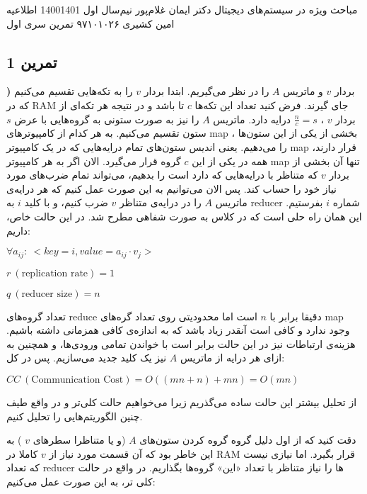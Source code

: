 \documentclass[a4paper,12pt]{article}
\newcounter{subproblemcounter}
\newcommand{\problem}[1]
{
	\subsection*{
		تمرین
		#1
	}
}
\newcommand{\subproblem}{
	\textbf{\harfi{subproblemcounter})}\stepcounter{subproblemcounter}
}
\begin{document}
\handout
{مباحث ویژه در سیستم‌های دیجیتال}
{دکتر ایمان غلام‌پور}
{نیم‌سال اول 1400\lr{-}1401}
{اطلاعیه}
{امین کشیری}
{۹۷۱۰۱۰۲۶}
 {تمرین سری اول}

\problem{1}

\subproblem{}
بردار 
$v$
و ماتریس 
$A$
را در نظر می‌گیریم. ابتدا بردار 
$v$
را به تکه‌هایی تقسیم می‌کنیم که در 
RAM
جای گیرند. فرض کنید تعداد این تکه‌ها 
$c$
تا باشد و در نتیجه‌ هر تکه‌ای از بردار 
$v$
، 
$\frac{n}{c} =  s$
درایه‌ دارد. ماتریس 
$A$
را نیز به صورت ستونی به گروه‌هایی با عرض 
$s$
ستون تقسیم می‌کنیم. به هر کدام از کامپیوتر‌های 
map
،
 بخشی از یکی از این ستون‌ها را می‌دهیم. یعنی اندیس ستون‌های تمام درایه‌هایی که در یک کامپیوتر 
 map
 قرار دارند، همه در یکی از این 
 $c$
 گروه قرار می‌گیرد. الان اگر به هر کامپیوتر 
 map
 تنها آن بخشی از بردار 
 $v$
 که متناظر با درایه‌هایی که دارد است را بدهیم، می‌تواند تمام ضرب‌های مورد نیاز خود را حساب کند. پس الان می‌توانیم 
 به این صورت عمل کنیم که هر درایه‌‌ی ماتریس 
 $A$
 را در درایه‌ی متناظر 
 $v$
 ضرب کنیم، و با کلید 
 $i$
 به 
 reducer
 شماره
 $i$
 بفرستیم. این همان راه حلی است که در کلاس به صورت شفاهی مطرح شد. در این حالت خاص، داریم:
 \begin{latin}
$\forall a_{ij} : \ < key = i, value = a_{ij} \cdot v_j >$

$r \ (\text{replication rate})= 1$

$q \ (\text{reducer size}) = n$

 \end{latin}
تعداد گروه‌های
reduce
دقیقا برابر با 
$n$
است اما محدودیتی روی تعداد گره‌های 
map
وجود ندارد و کافی است آنقدر زیاد باشد که به اندازه‌ی کافی همزمانی داشته باشیم. 
هزینه‌ی ارتباطات 
نیز در این حالت برابر است با خواندن تمامی ورودی‌ها، و همچنین به ازای هر درایه‌ از ماتریس 
$A$
نیز یک کلید جدید می‌سازیم. پس در کل:
\begin{latin}
$CC \ (\text{Communication Cost}) = O( (mn + n) + mn) = O(mn)$
\end{latin}

از تحلیل بیشتر این حالت ساده می‌گذریم زیرا 
می‌خواهیم حالت کلی‌تر و در واقع طیف چنین الگوریتم‌هایی را تحلیل کنیم.  

 دقت کنید که از اول دلیل گروه گروه کردن ستون‌های 
$A$
(و یا متناظرا سطر‌های
$v$
)
به این خاطر بود که آن قسمت مورد نیاز از
$v$
کاملا در 
RAM 
قرار بگیرد. اما نیازی نیست که تعداد
reducer
ها را نیاز متناظر با تعداد «این» گروه‌ها بگذاریم. در واقع در حالت کلی تر، به این صورت عمل می‌کنیم:
\end{document}
